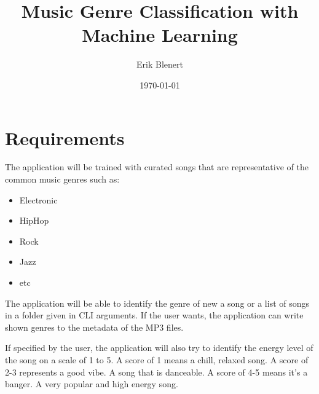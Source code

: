 \documentclass{article} %
\title{Music Genre Classification with Machine Learning} %
\author{Erik Blenert} %
\date{\today} %
\begin{document}
    \maketitle %
    
    \section{Requirements} %
    
    
    The application will be trained with curated songs that are representative of the common music genres such as: 
    \begin{itemize}
        \item Electronic
        \item HipHop
        \item Rock
        \item Jazz
        \item etc
    \end{itemize}

    The application will be able to identify the genre of new a song or a list of songs in a folder given in CLI arguments. If the user wants, the application can write shown genres to the metadata of the MP3 files.
    
    If specified by the user, the application will also try to identify the energy level of the song on a scale of 1 to 5. A score of 1 means a chill, relaxed song. A score of 2-3 represents a good vibe.
A song that is danceable. A score of 4-5 means it's a banger. A very popular and high energy song.

    
\end{document}
